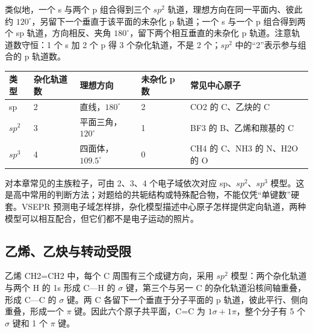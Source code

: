 \documentclass[UTF8,a4paper,zihao=5,oneside,openany,fontset=none]{ctexbook}
\def\sigma{σ}\def\pi{π}\def\Delta{Δ}\def\alpha{α}\def\beta{β}%
\def\mathrm#1{#1}\def\text#1{#1}\def\ensuremath#1{#1}\def\ce#1{#1}%
\begin{document}
类似地，一个 s 与两个 p 组合得到三个 $\mathrm{sp}^2$ 轨道，理想方向在同一平面内、彼此约 $120^\circ$，另留下一个垂直于该平面的未杂化 p 轨道；一个 s 与一个 p 组合得到两个 sp 轨道，方向相反、夹角 $180^\circ$，留下两个相互垂直的未杂化 p 轨道。注意轨道数守恒：1 个 s 加 2 个 p 得 3 个杂化轨道，不是 2 个；$\mathrm{sp}^2$ 中的“2”表示参与组合的 p 轨道数。

\begin{center}\small\begin{tabularx}{\linewidth}{llllX}
\toprule
类型&杂化轨道数&理想方向&未杂化 p 数&常见中心原子\\\midrule
sp&2&直线，$180^\circ$&2&\ce{CO2} 的 C、乙炔的 C\\
$\mathrm{sp}^2$&3&平面三角，$120^\circ$&1&\ce{BF3} 的 B、乙烯和羰基的 C\\
$\mathrm{sp}^3$&4&四面体，$109.5^\circ$&0&\ce{CH4} 的 C、\ce{NH3} 的 N、\ce{H2O} 的 O\\\bottomrule
\end{tabularx}\end{center}

对本章常见的主族粒子，可由 2、3、4 个电子域依次对应 sp、$\mathrm{sp}^2$、$\mathrm{sp}^3$ 模型。这是高中常用的判断方法；对题给的共轭结构或特殊配合物，不能仅凭“单键数”硬套。VSEPR 预测电子域怎样排，杂化模型描述中心原子怎样提供定向轨道，两种模型可以相互配合，但它们都不是电子运动的照片。

\subsection{乙烯、乙炔与转动受限}
乙烯 \ce{CH2=CH2} 中，每个 C 周围有三个成键方向，采用 $\mathrm{sp}^2$ 模型：两个杂化轨道与两个 H 的 1s 形成 C—H 的 $\sigma$ 键，第三个与另一 C 的杂化轨道沿核间轴重叠，形成 C—C 的 $\sigma$ 键。两 C 各留下一个垂直于分子平面的 p 轨道，彼此平行、侧向重叠，形成一个 $\pi$ 键。因此六个原子共平面，C=C 为 $1\sigma+1\pi$，整个分子有 5 个 $\sigma$ 键和 1 个 $\pi$ 键。
\end{document}
